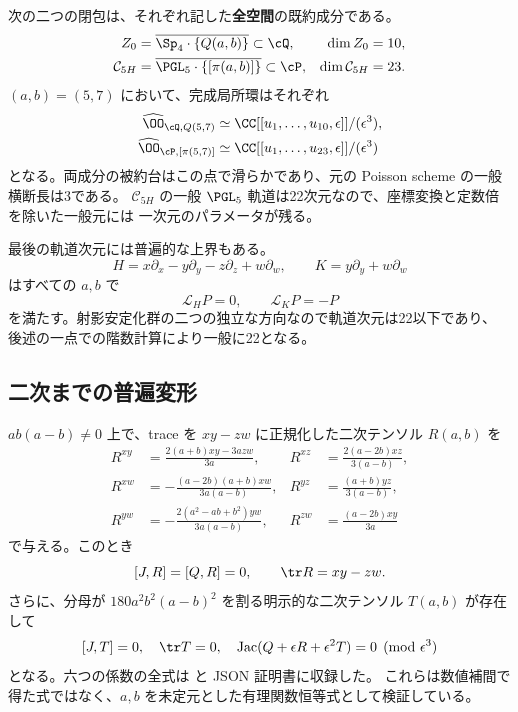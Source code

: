 \begin{theorem}\label{thm:zero_log}
次の二つの閉包は、それぞれ記した\textbf{全空間}の既約成分である。
\begin{align*}
 Z_0&=\overline{\Sp_4\cdot\{Q(a,b)\}}\subset\cQ,
      &\dim Z_0&=10,\\
 \mathcal C_{5H}&=\overline{\PGL_5\cdot\{[\pi(a,b)]\}}\subset\cP,
      &\dim\mathcal C_{5H}&=23.
\end{align*}
$(a,b)=(5,7)$ において、完成局所環はそれぞれ
\begin{align}
 \widehat{\OO}_{\cQ,Q(5,7)}
 &\simeq\CC[[u_1,\ldots,u_{10},\epsilon]]/(\epsilon^3),\label{eq:zeroQlocal}\\
 \widehat{\OO}_{\cP,[\pi(5,7)]}
 &\simeq\CC[[u_1,\ldots,u_{23},\epsilon]]/(\epsilon^3)\label{eq:zeroPlocal}
\end{align}
となる。両成分の被約台はこの点で滑らかであり、元の Poisson scheme の一般横断長は3である。
$\mathcal C_{5H}$ の一般 $\PGL_5$ 軌道は22次元なので、座標変換と定数倍を除いた一般元には
一次元のパラメータが残る。
\end{theorem}

最後の軌道次元には普遍的な上界もある。
\[
 H=x\partial_x-y\partial_y-z\partial_z+w\partial_w,
 \qquad K=y\partial_y+w\partial_w
\]
はすべての $a,b$ で
\[
 \mathcal L_H P=0,\qquad \mathcal L_KP=-P
\]
を満たす。射影安定化群の二つの独立な方向なので軌道次元は22以下であり、
後述の一点での階数計算により一般に22となる。

\subsection{二次までの普遍変形}
$ab(a-b)\ne0$ 上で、trace を $xy-zw$ に正規化した二次テンソル $R(a,b)$ を
\begin{equation}\label{eq:zeroR}
\begin{aligned}
 R^{xy}&=\frac{2(a+b)xy-3azw}{3a},
 &R^{xz}&=\frac{2(a-2b)xz}{3(a-b)},\\
 R^{xw}&=-\frac{(a-2b)(a+b)xw}{3a(a-b)},
 &R^{yz}&=\frac{(a+b)yz}{3(a-b)},\\
 R^{yw}&=-\frac{2(a^2-ab+b^2)yw}{3a(a-b)},
 &R^{zw}&=\frac{(a-2b)xy}{3a}
\end{aligned}
\end{equation}
で与える。このとき
\[
 [J,R]=[Q,R]=0,\qquad \tr R=xy-zw.
\]
さらに、分母が $180a^2b^2(a-b)^2$ を割る明示的な二次テンソル $T(a,b)$ が存在して
\begin{equation}\label{eq:zero2jet}
 [J,T]=0,\quad\tr T=0,\quad
 \operatorname{Jac}(Q+\epsilon R+\epsilon^2T)=0\pmod{\epsilon^3}
\end{equation}
となる。六つの係数の全式は
 と JSON 証明書に収録した。
これらは数値補間で得た式ではなく、$a,b$ を未定元とした有理関数恒等式として検証している。

